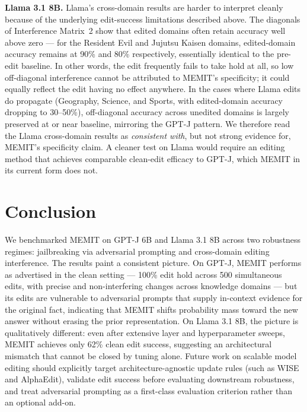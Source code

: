 \noindent \textbf{Llama 3.1 8B.} Llama's cross-domain results are harder to interpret cleanly because of the underlying edit-success limitations described above. The diagonals of Interference Matrix~2 show that edited domains often retain accuracy well above zero — for the Resident Evil and Jujutsu Kaisen domains, edited-domain accuracy remains at 90\% and 80\% respectively, essentially identical to the pre-edit baseline. In other words, the edit frequently fails to take hold at all, so low off-diagonal interference cannot be attributed to MEMIT's specificity; it could equally reflect the edit having no effect anywhere. In the cases where Llama edits do propagate (Geography, Science, and Sports, with edited-domain accuracy dropping to 30--50\%), off-diagonal accuracy across unedited domains is largely preserved at or near baseline, mirroring the GPT-J pattern. We therefore read the Llama cross-domain results as \emph{consistent with}, but not strong evidence for, MEMIT's specificity claim. A cleaner test on Llama would require an editing method that achieves comparable clean-edit efficacy to GPT-J, which MEMIT in its current form does not.


\section{Conclusion}
\label{sec:conclusion}
We benchmarked MEMIT on GPT-J 6B and Llama 3.1 8B across two robustness regimes: jailbreaking via adversarial prompting and cross-domain editing interference. The results paint a consistent picture. On GPT-J, MEMIT performs as advertised in the clean setting — 100\% edit hold across 500 simultaneous edits, with precise and non-interfering changes across knowledge domains — but its edits are vulnerable to adversarial prompts that supply in-context evidence for the original fact, indicating that MEMIT shifts probability mass toward the new answer without erasing the prior representation. On Llama 3.1 8B, the picture is qualitatively different: even after extensive layer and hyperparameter sweeps, MEMIT achieves only 62\% clean edit success, suggesting an architectural mismatch that cannot be closed by tuning alone. Future work on scalable model editing should explicitly target architecture-agnostic update rules (such as WISE and AlphaEdit), validate edit success before evaluating downstream robustness, and treat adversarial prompting as a first-class evaluation criterion rather than an optional add-on.
